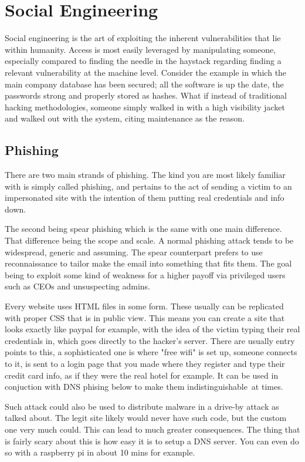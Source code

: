 \section{Social Engineering}
Social engineering is the art of exploiting the inherent vulnerabilities that lie within humanity. Access is most easily leveraged by manipulating someone, especially compared to finding the needle in the haystack regarding finding a relevant vulnerability at the machine level. 
Consider the example in which the main company database has been secured; all the software is up the date, the passwords strong and properly stored as hashes. What if instead of traditional hacking methodologies, someone simply walked in with a high visibility jacket and walked out with the system, 
citing maintenance as the reason. \citep{AssignmentSecurityForensicsPaper}



\subsection{Phishing}

There are two main strands of phishing. The kind you are most likely familiar with is simply called phishing, and pertains to the act of sending a victim to an impersonated site with the intention of them putting real credentials and info down. 

The second being spear phishing which is the same with one main difference. That difference being the scope and scale. A normal phishing attack tends to be widespread, generic and assuming. The spear counterpart prefers to use reconnaissance to tailor make the email into something that fits them. The goal being to exploit some kind of weakness for a higher payoff via privileged users such as CEOs and unsuspecting admins.

Every website uses HTML files in some form. These usually can be replicated with proper CSS that is in public view. This means you can create a site that looks exactly like paypal for example, with the idea of the victim typing their real credentials in, 
which goes directly to the hacker's server. There are usually entry points to this, a sophisticated one is where "free wifi" is set up, someone connects to it, is sent to a login page that you made where they register and type their credit card info, 
as if they were the real hotel for example. It can be used in conjuction with DNS phising below to make them indistinguishable at times.

Such attack could also be used to distribute malware in a drive-by attack as talked about. The legit site likely would never have such code, but the custom one very much could. This can lead to much greater consequences. The thing that is fairly scary about this is how easy it is to setup a DNS server. You can even do so with a raspberry pi in about 10 mins for example.

